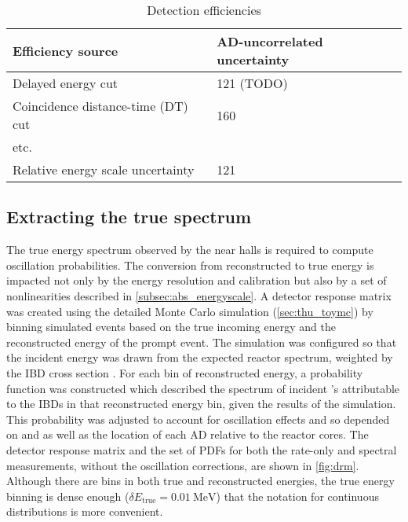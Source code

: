 \begin{table}[ht]
    \centering
    \begin{tabular}[t]{ll}
        \hline
        Efficiency source &  AD-uncorrelated uncertainty\\
        \hline
        Delayed energy cut & 121 (TODO)\\
        Coincidence distance-time (DT) cut & 160 \\
        etc. & \\
        \hline
        Relative energy scale uncertainty & 121 \\
        \hline
    \end{tabular}
    \caption{Detection efficiencies}
    \label{tab:efficiencies}
\end{table}


\subsection{Extracting the true \texorpdfstring{\nuebar{}}{antineutrino} spectrum}
\label{subsec:reco_to_true_energy}

The true \nuebar{} energy spectrum observed by the near halls
is required to compute oscillation probabilities.
The conversion from reconstructed to true energy
is impacted not only by the energy resolution and calibration
but also by a set of nonlinearities described in \cref{subsec:abs_energyscale}.
A detector response matrix was created
using the detailed Monte Carlo simulation (\cref{sec:thu_toymc})
by binning simulated events based on the true incoming \nuebar{} energy
and the reconstructed energy of the prompt event.
The simulation was configured so that the incident \nuebar{} energy
was drawn from the expected reactor \nuebar{} spectrum,
weighted by the IBD cross section .
For each bin of reconstructed energy,
a probability function was constructed
which described the spectrum of incident \nuebar{}'s
attributable to the IBDs in that reconstructed energy bin,
given the results of the simulation.
This probability was adjusted to account for
oscillation effects and so depended on \thetaot{} and \dmee{}
as well as the location of each AD relative to the reactor cores.
The detector response matrix and the set of PDFs
for both the rate-only and spectral measurements,
without the oscillation corrections,
are shown in \cref{fig:drm}.
Although there are bins in both true and reconstructed energies,
the true energy binning is dense enough ($\delta E_{\text{true}} = \SI{0.01}{\MeV}$)
that the notation for continuous distributions is more convenient.


